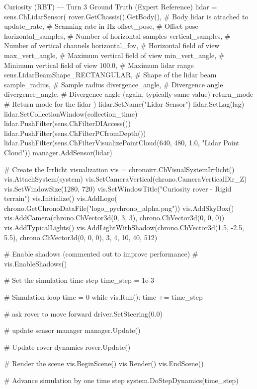 \begin{CodeBlock}[breakable]{Curiosity (RBT) --- Turn 3 Ground Truth (Expert Reference)}
lidar = sens.ChLidarSensor(
    rover.GetChassis().GetBody(),              # Body lidar is attached to
    update_rate,            # Scanning rate in Hz
    offset_pose,            # Offset pose
    horizontal_samples,     # Number of horizontal samples
    vertical_samples,       # Number of vertical channels
    horizontal_fov,         # Horizontal field of view
    max_vert_angle,         # Maximum vertical field of view
    min_vert_angle,         # Minimum vertical field of view
    100.0,                  # Maximum lidar range
    sens.LidarBeamShape_RECTANGULAR,  # Shape of the lidar beam
    sample_radius,          # Sample radius
    divergence_angle,       # Divergence angle
    divergence_angle,       # Divergence angle (again, typically same value)
    return_mode             # Return mode for the lidar
)
lidar.SetName("Lidar Sensor")
lidar.SetLag(lag)
lidar.SetCollectionWindow(collection_time)
lidar.PushFilter(sens.ChFilterDIAccess())
lidar.PushFilter(sens.ChFilterPCfromDepth())
lidar.PushFilter(sens.ChFilterVisualizePointCloud(640, 480, 1.0, "Lidar Point Cloud"))
manager.AddSensor(lidar)

# Create the Irrlicht visualization
vis = chronoirr.ChVisualSystemIrrlicht()
vis.AttachSystem(system)
vis.SetCameraVertical(chrono.CameraVerticalDir_Z)
vis.SetWindowSize(1280, 720)
vis.SetWindowTitle("Curiosity rover - Rigid terrain")
vis.Initialize()
vis.AddLogo(
    chrono.GetChronoDataFile("logo_pychrono_alpha.png"))
vis.AddSkyBox()
vis.AddCamera(chrono.ChVector3d(0, 3, 3), chrono.ChVector3d(0, 0, 0))
vis.AddTypicalLights()
vis.AddLightWithShadow(chrono.ChVector3d(1.5, -2.5, 5.5), chrono.ChVector3d(0, 0, 0), 3, 4, 10, 40, 512)

# Enable shadows (commented out to improve performance)
# vis.EnableShadows()

# Set the simulation time step
time_step = 1e-3

# Simulation loop
time = 0
while vis.Run():
    time += time_step

    # ask rover to move forward
    driver.SetSteering(0.0)

    # update sensor manager
    manager.Update()
    
    # Update rover dynamics
    rover.Update()

    # Render the scene
    vis.BeginScene()
    vis.Render()
    vis.EndScene()

    # Advance simulation by one time step
    system.DoStepDynamics(time_step)
\end{CodeBlock}
